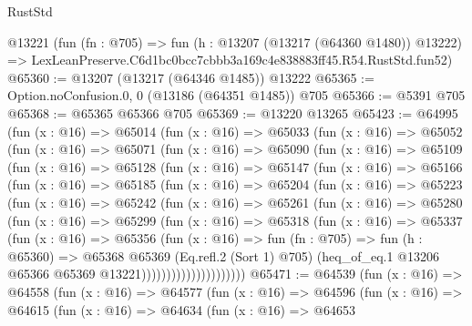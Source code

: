 \begin{lexlean}{RustStd}
\begin{coremodule}
    @13221
    (fun (fn : @705) =>
    fun (h : @13207 (@13217 (@64360 @1480)) @13222) =>
    LexLeanPreserve.C6d1bc0bcc7cbbb3a169c4e838883ff45.R54.RustStd.fun52)
@65360 := @13207 (@13217 (@64346 @1485)) @13222
@65365 := Option.noConfusion.{0, 0} (@13186 (@64351 @1485)) @705
@65366 := @5391 @705
@65368 := @65365 @65366 @705
@65369 := @13220 @13265
@65423 := @64995
    (fun (x : @16) =>
    @65014
      (fun (x : @16) =>
      @65033
        (fun (x : @16) =>
        @65052
          (fun (x : @16) =>
          @65071
            (fun (x : @16) =>
            @65090
              (fun (x : @16) =>
              @65109
                (fun (x : @16) =>
                @65128
                  (fun (x : @16) =>
                  @65147
                    (fun (x : @16) =>
                    @65166
                      (fun (x : @16) =>
                      @65185
                        (fun (x : @16) =>
                        @65204
                          (fun (x : @16) =>
                          @65223
                            (fun (x : @16) =>
                            @65242
                              (fun (x : @16) =>
                              @65261
                                (fun (x : @16) =>
                                @65280
                                  (fun (x : @16) =>
                                  @65299
                                    (fun (x : @16) =>
                                    @65318
                                      (fun (x : @16) =>
                                      @65337
                                        (fun (x : @16) =>
                                        @65356
                                          (fun (x : @16) =>
                                          fun (fn : @705) =>
                                          fun (h : @65360) =>
                                          @65368
                                            @65369
                                            (Eq.refl.{2} (Sort 1) @705)
                                            (heq_of_eq.{1}
                                              @13206
                                              @65366
                                              @65369
                                              @13221)))))))))))))))))))))
@65471 := @64539
    (fun (x : @16) =>
    @64558
      (fun (x : @16) =>
      @64577
        (fun (x : @16) =>
        @64596
          (fun (x : @16) =>
          @64615
            (fun (x : @16) =>
            @64634
              (fun (x : @16) =>
              @64653

\end{coremodule}
\end{lexlean}
